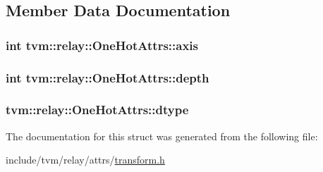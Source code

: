 \subsection{Member Data Documentation}
\subsubsection[{\texorpdfstring{axis}{axis}}]{\setlength{\rightskip}{0pt plus 5cm}int tvm\+::relay\+::\+One\+Hot\+Attrs\+::axis}\hypertarget{structtvm_1_1relay_1_1OneHotAttrs_a8287fc14b2ad6671f6ab51ba77134aa1}{}\label{structtvm_1_1relay_1_1OneHotAttrs_a8287fc14b2ad6671f6ab51ba77134aa1}
\subsubsection[{\texorpdfstring{depth}{depth}}]{\setlength{\rightskip}{0pt plus 5cm}int tvm\+::relay\+::\+One\+Hot\+Attrs\+::depth}\hypertarget{structtvm_1_1relay_1_1OneHotAttrs_a698ab8a2112fff60a95425155e015a78}{}\label{structtvm_1_1relay_1_1OneHotAttrs_a698ab8a2112fff60a95425155e015a78}
\subsubsection[{\texorpdfstring{dtype}{dtype}}]{ tvm\+::relay\+::\+One\+Hot\+Attrs\+::dtype}\hypertarget{structtvm_1_1relay_1_1OneHotAttrs_ae77cd5a12123839e40c9ff43cfe26d12}{}\label{structtvm_1_1relay_1_1OneHotAttrs_ae77cd5a12123839e40c9ff43cfe26d12}


The documentation for this struct was generated from the following file\+:\begin{DoxyCompactItemize}
\item 
include/tvm/relay/attrs/\hyperlink{include_2tvm_2relay_2attrs_2transform_8h}{transform.\+h}\end{DoxyCompactItemize}
